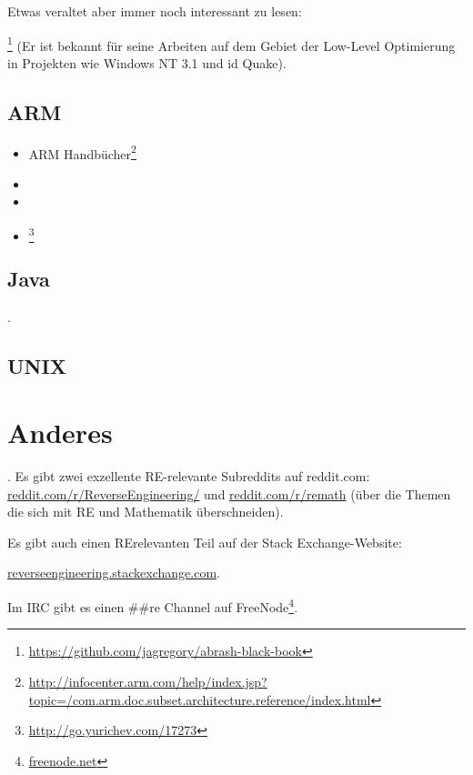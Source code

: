 Etwas veraltet aber immer noch interessant zu lesen:

\MAbrash\footnote{\AlsoAvailableAs \url{https://github.com/jagregory/abrash-black-book}}
(Er ist bekannt für seine Arbeiten auf dem Gebiet der Low-Level Optimierung in Projekten wie Windows NT 3.1 und id Quake).

\subsection{ARM}

\begin{itemize}
\item ARM Handbücher\footnote{\AlsoAvailableAs \url{http://infocenter.arm.com/help/index.jsp?topic=/com.arm.doc.subset.architecture.reference/index.html}}

\item \ARMSevenRef

\item \ARMSixFourRefURL

\item \ARMCookBook\footnote{\AlsoAvailableAs \url{http://go.yurichev.com/17273}}
\end{itemize}

\subsection{Java}

\JavaBook.

\subsection{UNIX}

\TAOUP



\section{Anderes}

\HenryWarren.
Es gibt zwei exzellente \ac{RE}-relevante Subreddits auf reddit.com:
\href{http://go.yurichev.com/17027}{reddit.com/r/ReverseEngineering/} und
\href{http://go.yurichev.com/17028}{reddit.com/r/remath}
(über die Themen die sich mit \ac{RE} und Mathematik überschneiden).

Es gibt auch einen \ac{RE}relevanten Teil auf der Stack Exchange-Website:

\par \href{http://go.yurichev.com/17029}{reverseengineering.stackexchange.com}.

Im IRC gibt es einen \#\#re Channel auf
FreeNode\footnote{\href{http://go.yurichev.com/17030}{freenode.net}}.

